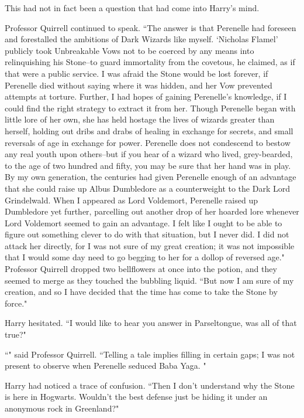 This had not in fact been a question that had come into Harry's mind.

Professor Quirrell continued to speak. ``The answer is that Perenelle had foreseen and forestalled the ambitions of Dark Wizards like myself. `Nicholas Flamel' publicly took Unbreakable Vows not to be coerced by any means into relinquishing his Stone\---to guard immortality from the covetous, he claimed, as if that were a public service. I was afraid the Stone would be lost forever, if Perenelle died without saying where it was hidden, and her Vow prevented attempts at torture. Further, I had hopes of gaining Perenelle's knowledge, if I could find the right strategy to extract it from her. Though Perenelle began with little lore of her own, she has held hostage the lives of wizards greater than herself, holding out dribs and drabs of healing in exchange for secrets, and small reversals of age in exchange for power. Perenelle does not condescend to bestow any real youth upon others\---but if you hear of a wizard who lived, grey-bearded, to the age of two hundred and fifty, you may be sure that her hand was in play. By my own generation, the centuries had given Perenelle enough of an advantage that she could raise up Albus Dumbledore as a counterweight to the Dark Lord Grindelwald. When I appeared as Lord Voldemort, Perenelle raised up Dumbledore yet further, parcelling out another drop of her hoarded lore whenever Lord Voldemort seemed to gain an advantage. I felt like I ought to be able to figure out something clever to do with that situation, but I never did. I did not attack her directly, for I was not sure of my great creation; it was not impossible that I would some day need to go begging to her for a dollop of reversed age." Professor Quirrell dropped two bellflowers at once into the potion, and they seemed to merge as they touched the bubbling liquid. ``But now I am sure of my creation, and so I have decided that the time has come to take the Stone by force."

Harry hesitated. ``I would like to hear you answer in Parseltongue, was all of that true?"

``" said Professor Quirrell. ``Telling a tale implies filling in certain gaps; I was not present to observe when Perenelle seduced Baba Yaga. "

Harry had noticed a trace of confusion. ``Then I don't understand why the Stone is here in Hogwarts. Wouldn't the best defense just be hiding it under an anonymous rock in Greenland?"

